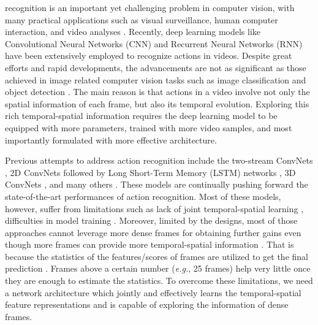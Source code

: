 \documentclass[english, 10pt, twocolumn, twoside]{IEEEtran}
\begin{document}
 recognition is an important yet challenging problem in computer vision, with many practical applications such as visual surveillance, human computer interaction, and video analyses \cite{aggarwal2011human}. Recently, deep learning models like Convolutional Neural Networks (CNN) \cite{simonyan2014two,wang2016temporal,zhu2016key,feichtenhofer2016convolutional} and Recurrent Neural Networks (RNN) \cite{yue2015beyond,donahue2015long,sharma2015actionattention,li2016videolstm,wu2016multi,wang2016hierarchical} have been extensively employed to recognize actions in videos. Despite great efforts and rapid developments, the advancements are not as significant as those achieved in image related computer vision tasks such as image classification \cite{krizhevsky2012imagenet,simonyan2014very,he2016deep} and object detection \cite{ren2015faster,liu2016ssd,redmon2016yolo9000}. The main reason is that actions in a video involve not only the spatial information of each frame, but also its temporal evolution. Exploring this rich temporal-spatial information requires the deep learning model to be equipped with more parameters, trained with more video samples, and most importantly formulated with more effective architecture.

Previous attempts to address action recognition include the two-stream ConvNets \cite{simonyan2014two,wang2016temporal,feichtenhofer2016convolutional,diba2017deeptemporal}, 2D ConvNets followed by Long Short-Term Memory (LSTM) networks \cite{donahue2015long,yue2015beyond,li2016videolstm,wu2016multi,wang2016hierarchical}, 3D ConvNets \cite{ji20133d,tran2015learning}, and many others \cite{sharma2015actionattention,li2016action,wang2017spatiotemporal}. These models are continually pushing forward the state-of-the-art performances of action recognition. Most of these models, however, suffer from limitations such as lack of joint temporal-spatial learning \cite{simonyan2014two,wang2016temporal,feichtenhofer2016convolutional,diba2017deeptemporal}, difficulties in model training \cite{donahue2015long,yue2015beyond,li2016videolstm,ji20133d,tran2015learning}. Moreover, limited by the designs, most of those approaches cannot leverage more dense frames for obtaining further gains even though more frames can provide more temporal-spatial information \cite{wang2016temporal,diba2016deep,wang2013action}. That is because the statistics of the features/scores of frames are utilized to get the final prediction \cite{wang2016temporal,diba2016deep}. Frames above a certain number (\emph{e.g.}, 25 frames) help very little once they are enough to estimate the statistics. To overcome these limitations, we need a network architecture which jointly and effectively learns the temporal-spatial feature representations and is capable of exploring the information of dense frames.
\end{document}
